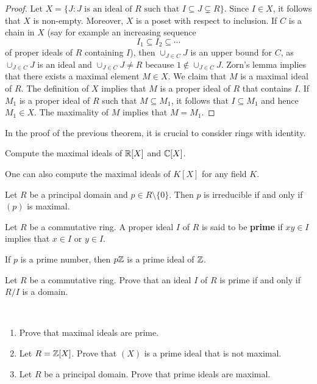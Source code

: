 \begin{proof}
	Let $X=\{J:J\text{ is an ideal of $R$ such that }I\subseteq J\subsetneq R\}$.
	Since $I\in X$, it follows that $X$ is non-empty. Moreover, $X$ is a poset
	with respect to inclusion. If $C$ is a chain in $X$ (say for example
	an increasing sequence
	\[
	I_1\subseteq I_2\subseteq\cdots
	\]
	of proper ideals of $R$ containing $I$), then 
	$\cup_{J\in C}J$ is an upper bound for $C$, as $\cup_{J\in C}J$ is an ideal and
	$\cup_{J\in C}J\ne R$ because $1\not\in\cup_{J\in C}J$. 	Zorn's lemma implies that
	there exists a maximal element $M\in X$. We claim that $M$ is a maximal ideal of $R$. The definition
	of $X$ implies that $M$ is a proper ideal of $R$ that contains $I$. If $M_1$ is a proper ideal of $R$
	such that $M\subseteq M_1$, it follows that $I\subseteq M_1$ and hence $M_1\in X$. The maximality
	of $M$ implies that $M=M_1$.  
\end{proof}

In the proof of the previous theorem, it is crucial to consider rings with 
identity. 

\begin{exercise}
	Compute the maximal ideals of $\mathbb{R}[X]$ and $\mathbb{C}[X]$. 	
\end{exercise}

One can also compute the maximal ideals of $K[X]$ for any field $K$. 

\begin{exercise}
	Let $R$ be a principal domain and $p\in R\setminus\{0\}$. 
	Then $p$ is irreducible 
	if and only if $(p)$ is maximal.	
\end{exercise}

\begin{definition}
Let $R$ be a commutative ring. A proper ideal $I$ of $R$ is said to be
\textbf{prime} if $xy\in I$ implies that $x\in I$ or $y\in I$. 
\end{definition}

If $p$ is a prime number, then $p\mathbb{Z}$ is a prime ideal of $\mathbb{Z}$.

\begin{exercise}
\label{xca:prime<=>domain}
    Let $R$ be a commutative ring. 
    Prove that an ideal $I$ of $R$ is prime if and only if $R/I$ is a domain. 
\end{exercise}

\begin{exercise}\
\label{xca:maximal=>prime}
\begin{enumerate}
    \item Prove that maximal ideals are prime. 
    \item Let $R=\mathbb{Z}[X]$. Prove that $(X)$ is a prime ideal that is not maximal.
    \item Let $R$ be a principal domain. Prove that prime ideals are maximal. 
\end{enumerate}
\end{exercise}

